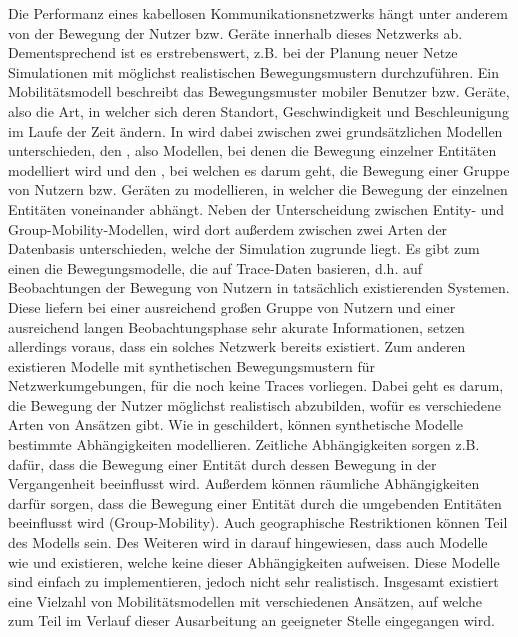 \documentclass[12pt, a4paper]{article}
\begin{document}
Die Performanz eines kabellosen Kommunikationsnetzwerks hängt unter anderem von der Bewegung 
der Nutzer bzw. Geräte innerhalb dieses Netzwerks ab. Dementsprechend ist es erstrebenswert,
z.B. bei der Planung neuer Netze Simulationen mit möglichst realistischen Bewegungsmustern durchzuführen.
Ein Mobilitätsmodell beschreibt das Bewegungsmuster mobiler Benutzer bzw. Geräte,
also die Art, in welcher sich deren Standort, Geschwindigkeit und Beschleunigung im Laufe der Zeit ändern. \cite{Camp2002}
In \cite{Camp2002} wird dabei zwischen zwei grundsätzlichen Modellen unterschieden, den ,
also Modellen, bei denen die Bewegung einzelner Entitäten modelliert wird und den ,
bei welchen es darum geht, die Bewegung einer Gruppe von Nutzern bzw. Geräten zu modellieren,
in welcher die Bewegung der einzelnen Entitäten voneinander abhängt.\newline
Neben der Unterscheidung zwischen Entity- und Group-Mobility-Modellen, wird dort außerdem zwischen zwei Arten der Datenbasis unterschieden,
welche der Simulation zugrunde liegt. Es gibt zum einen die Bewegungsmodelle, die auf Trace-Daten basieren, d.h. auf Beobachtungen
der Bewegung von Nutzern in tatsächlich existierenden Systemen. Diese liefern bei einer ausreichend großen Gruppe von Nutzern
und einer ausreichend langen Beobachtungsphase sehr akurate Informationen, setzen allerdings voraus, dass ein solches Netzwerk
bereits existiert. \cite{Camp2002} Zum anderen existieren Modelle mit synthetischen Bewegungsmustern für Netzwerkumgebungen, 
für die noch keine Traces vorliegen. Dabei geht es darum, die Bewegung der Nutzer möglichst realistisch abzubilden,
wofür es verschiedene Arten von Ansätzen gibt.\newline
Wie in \cite{Aschenbruck2011} geschildert, können synthetische Modelle bestimmte Abhängigkeiten modellieren.
Zeitliche Abhängigkeiten sorgen z.B. dafür, dass die Bewegung einer Entität durch dessen Bewegung in der Vergangenheit
beeinflusst wird. Außerdem können räumliche Abhängigkeiten darfür sorgen, dass die Bewegung einer Entität durch die umgebenden 
Entitäten beeinflusst wird (Group-Mobility). Auch geographische Restriktionen können Teil des Modells sein.
Des Weiteren wird in \cite{Aschenbruck2011} darauf hingewiesen, dass auch Modelle wie
 und  existieren, welche keine dieser Abhängigkeiten
aufweisen. Diese Modelle sind einfach zu implementieren, jedoch nicht sehr realistisch.
Insgesamt existiert eine Vielzahl von Mobilitätsmodellen mit verschiedenen Ansätzen,
auf welche zum Teil im Verlauf dieser Ausarbeitung an geeigneter Stelle eingegangen wird.
\end{document}
